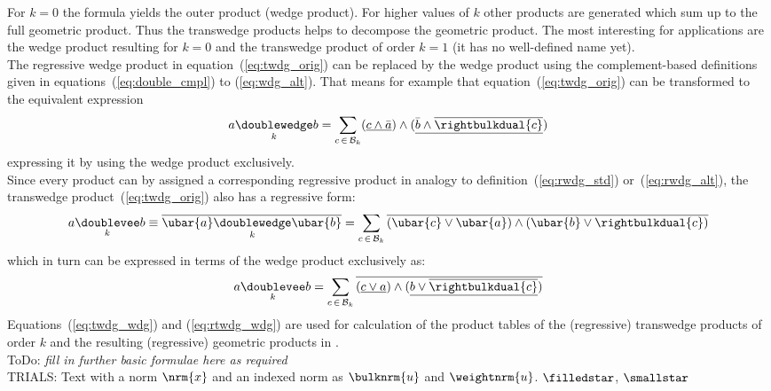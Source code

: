 For $k=0$ the formula yields the outer product (wedge product). For higher values of $k$
other products are generated which sum up to the full geometric product. Thus the
transwedge products helps to decompose the geometric product. The most interesting for
applications are the wedge product resulting for $k=0$ and the transwedge product of order
$k=1$ (it has no well-defined name yet). \\

The regressive wedge product in equation~(\ref{eq:twdg_orig}) can be replaced by the wedge
product using the complement-based definitions given in equations~(\ref{eq:double_cmpl})
to (\ref{eq:wdg_alt}). That means for example that equation~(\ref{eq:twdg_orig}) can be
transformed to the equivalent expression
\begin{equation}
    a \underset{k}{\doublewedge} b = \sum_{c \, \in \, \mathcal{B}_k}
    (\underline{c \wedge \bar{a}}) \wedge
    (\underline{\bar{b} \wedge \overline{\rightbulkdual{c}}})
    \label{eq:twdg_wdg}
\end{equation}
expressing it by using the wedge product exclusively. \\

Since every product can by assigned a corresponding regressive product in analogy to
definition~(\ref{eq:rwdg_std}) or~(\ref{eq:rwdg_alt}), the transwedge
product~(\ref{eq:twdg_orig}) also has a regressive form:
\begin{equation}
    a \underset{k}{\doublevee} b \equiv
    \overline{\ubar{a} \underset{k}{\doublewedge} \ubar{b}} =
    \sum_{c \, \in \, \mathcal{B}_k} \overline{
    (\ubar{c}\vee \ubar{a}) \wedge (\ubar{b} \vee \rightbulkdual{c})}
    \label{eq:rtwdg_orig}
\end{equation}
which in turn can be expressed in terms of the wedge product exclusively as:
\begin{equation}
    a \underset{k}{\doublevee} b = \sum_{c \, \in \, \mathcal{B}_k}  \overline{
    (\underline{c\vee a}) \wedge (\underline{b \vee \overline{\rightbulkdual{c}}})}
    \label{eq:rtwdg_wdg}
\end{equation}
Equations~(\ref{eq:twdg_wdg}) and (\ref{eq:rtwdg_wdg}) are used for calculation of the
product tables of the (regressive) transwedge products of order $k$ and the resulting
(regressive) geometric products in . \\


ToDo: \emph{fill in further basic formulae here as required} \\

TRIALS:
Text with a norm $\nrm{x}$ and an indexed norm as $\bulknrm{u}$ and $\weightnrm{u}$.
$\filledstar$, $\smallstar$ \\


\newpage